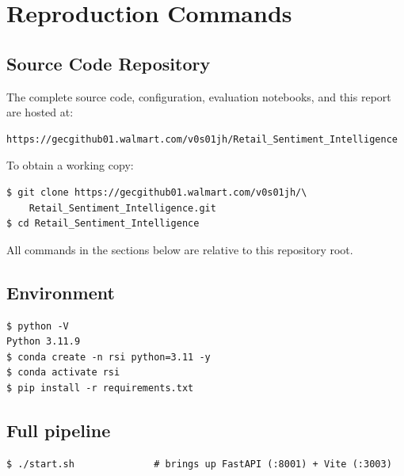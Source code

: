 \chapter{Reproduction Commands}\label{app:repro}

\section{Source Code Repository}\label{sec:repo}
The complete source code, configuration, evaluation notebooks, and this
report are hosted at:
\begin{verbatim}
https://gecgithub01.walmart.com/v0s01jh/Retail_Sentiment_Intelligence
\end{verbatim}
To obtain a working copy:
\begin{verbatim}
$ git clone https://gecgithub01.walmart.com/v0s01jh/\
    Retail_Sentiment_Intelligence.git
$ cd Retail_Sentiment_Intelligence
\end{verbatim}
All commands in the sections below are relative to this repository root.

\section{Environment}
\begin{verbatim}
$ python -V
Python 3.11.9
$ conda create -n rsi python=3.11 -y
$ conda activate rsi
$ pip install -r requirements.txt
\end{verbatim}

\section{Full pipeline}
\begin{verbatim}
$ ./start.sh              # brings up FastAPI (:8001) + Vite (:3003)
\end{verbatim}
